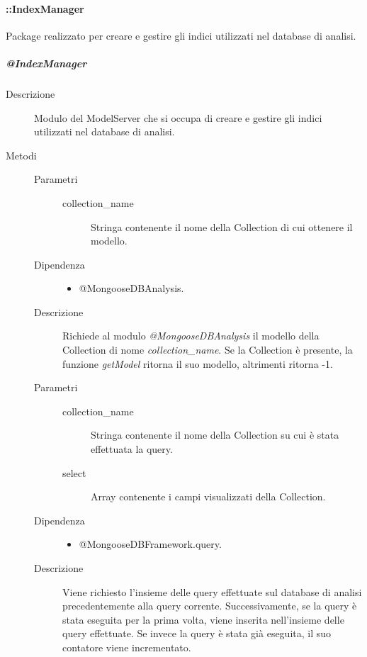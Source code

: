 \paragraph{::IndexManager}
Package realizzato per creare e gestire gli indici utilizzati nel database di analisi.
\subparagraph{@IndexManager}
\begin{description}
 \item[Descrizione]
 Modulo del ModelServer che si occupa di creare e gestire gli indici utilizzati nel database di analisi. 
 \item[Metodi]
  \begin{mldescription}
	\begin{description}
	 \item[Parametri]
	  \begin{description}
	   \item[collection\_name]
	   Stringa contenente il nome della Collection di cui ottenere il modello.
	  \end{description}
	 \item[Dipendenza]
	  \begin{itemize}
	   \item @MongooseDBAnalysis.
	  \end{itemize}
	 \item[Descrizione]
	 Richiede al modulo \textit{@MongooseDBAnalysis} il modello della Collection di nome \textit{collection\_name}. Se la Collection è presente, la funzione \textit{getModel} ritorna il suo modello, altrimenti ritorna -1.
	\end{description}	    
    
    \begin{description}
	 \item[Parametri]
	  \begin{description}
	   \item[collection\_name]
	   Stringa contenente il nome della Collection su cui è stata effettuata la query.
	   \item[select]
	   Array contenente i campi visualizzati della Collection.
	  \end{description}
	 \item[Dipendenza]
	  \begin{itemize}
	   \item @MongooseDBFramework.query.
	  \end{itemize}
	 \item[Descrizione]
	 Viene richiesto l'insieme delle query effettuate sul database di analisi precedentemente alla query corrente. Successivamente, se la query è stata eseguita per la prima volta, viene inserita nell'insieme delle query effettuate. Se invece la query è stata già eseguita, il suo contatore viene incrementato.
	\end{description}	    
    

\end{mldescription}
\end{description}
